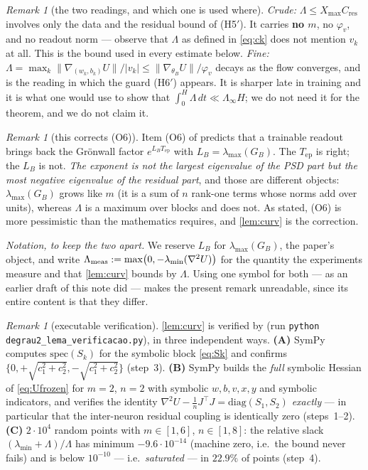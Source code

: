 \documentclass[11pt]{article}
\theoremstyle{remark}
\newtheorem{remark}[theorem]{Remark}
\newcommand{\Tep}{T_{\mathrm{ep}}}
\newcommand{\Cres}{C_{\mathrm{res}}}
\newcommand{\Xmax}{X_{\max}}
\newcommand{\hyplabel}[1]{\textup{(#1)}}
\begin{document}
\begin{remark}[the two readings, and which one is used where]\label{rem:readings}
\emph{Crude:} $\Lambda\le\Xmax\Cres$ involves only the data and the residual
bound of \hyplabel{H5$'$}. It carries \textbf{no $m$}, no $\varphi_v$, and no
readout norm --- observe that $\Lambda$ as defined in \eqref{eq:ck} does not
mention $v_k$ at all. This is the bound used in every estimate below.
\emph{Fine:} $\Lambda=\max_k\|\nabla_{(w_k,b_k)}U\|/|v_k|\le
\|\nabla_{\theta_B}U\|/\varphi_v$ decays as the flow converges, and is the
reading in which the guard \hyplabel{H6$'$} appears. It is sharper late in
training and it is what one would use to show that $\int_0^H\Lambda\,dt\ll
\Lambda_\infty H$; we do not need it for the theorem, and we do not claim it.
\end{remark}

\begin{remark}[this corrects (O6)]\label{rem:O6}
Item (O6) of \cite{paper} predicts that a trainable readout brings back the
Gr\"onwall factor $e^{L_B\Tep}$ with $L_B=\lambda_{\max}(G_B)$. The $\Tep$ is
right; the $L_B$ is not. \emph{The exponent is not the largest eigenvalue of the
PSD part but the most negative eigenvalue of the residual part}, and those are
different objects: $\lambda_{\max}(G_B)$ grows like $m$ (it is a sum of $n$ rank-one
terms whose norms add over units), whereas $\Lambda$ is a maximum over blocks and
does not. As stated, (O6) is more pessimistic than the mathematics requires,
and \cref{lem:curv} is the correction.

\emph{Notation, to keep the two apart.} We reserve $L_B$ for
$\lambda_{\max}(G_B)$, the paper's object, and write
$\Lambda_{\rm meas}:=\max\bigl(0,-\lambda_{\min}(\nabla^2U)\bigr)$ for the
quantity the experiments measure and that \cref{lem:curv} bounds by $\Lambda$.
Using one symbol for both --- as an earlier draft of this note did --- makes the
present remark unreadable, since its entire content is that they differ.
\end{remark}

\begin{remark}[executable verification]\label{rem:verif}
\cref{lem:curv} is verified by
 (run
\texttt{python degrau2\_lema\_verificacao.py}), in three independent ways.
\textbf{(A)} SymPy computes $\mathrm{spec}(S_k)$ for the symbolic block
\eqref{eq:Sk} and confirms $\{0,+\sqrt{c_1^2+c_2^2},-\sqrt{c_1^2+c_2^2}\}$
(step~3). \textbf{(B)} SymPy builds the \emph{full} symbolic Hessian of
\eqref{eq:Ufrozen} for $m=2$, $n=2$ with symbolic
$w,b,v,x,y$ and symbolic indicators, and verifies the identity
$\nabla^2U-\frac1nJ^\top J=\mathrm{diag}(S_1,S_2)$ \emph{exactly} --- in
particular that the inter-neuron residual coupling is identically zero
(steps~1--2). \textbf{(C)} $2\cdot10^4$ random points with $m\in[1,6]$,
$n\in[1,8]$: the relative slack $(\lambda_{\min}+\Lambda)/\Lambda$ has minimum
$-9.6\cdot10^{-14}$ (machine zero, i.e.\ the bound never fails) and is below
$10^{-10}$ --- i.e.\ \emph{saturated} --- in $22.9\%$ of points (step~4).
\end{remark}
\end{document}
